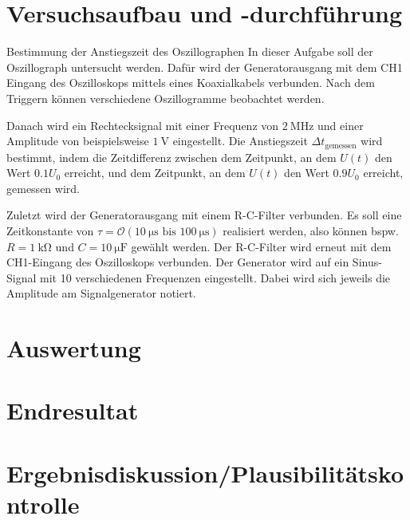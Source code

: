 \documentclass[ngerman]{scrartcl}
\theoremstyle{definition}
\begin{document}
	\section{Versuchsaufbau und -durchführung}
	\begin{aufgabe}{Bestimmung der Anstiegszeit des Oszillographen}
		In dieser Aufgabe soll der Oszillograph untersucht werden. Dafür wird der Generatorausgang mit dem CH1 Eingang des Oszilloskops mittels eines Koaxialkabels verbunden. Nach dem Triggern können verschiedene Oszillogramme beobachtet werden.
		
		Danach wird ein Rechtecksignal mit einer Frequenz von $\SI{2}{\mega\hertz}$ und einer Amplitude von beispielsweise $\SI{1}{\volt}$ eingestellt. Die Anstiegszeit $\Delta t_\mathrm{gemessen}$ wird bestimmt, indem die Zeitdifferenz zwischen dem Zeitpunkt, an dem $U(t)$ den Wert $0.1 U_0$ erreicht, und dem Zeitpunkt, an dem $U(t)$ den Wert $0.9 U_0$ erreicht, gemessen wird.
		
		Zuletzt wird der Generatorausgang mit einem R-C-Filter verbunden. Es soll eine Zeitkonstante von $\tau = \mathcal{O}(\SI{10}{\micro\second} \text{ bis } \SI{100}{\micro\second})$ realisiert werden, also können bspw. $R = \SI{1}{\kilo\ohm}$ und $C = \SI{10}{\micro\farad}$ gewählt werden. Der R-C-Filter wird erneut mit dem CH1-Eingang des Oszilloskops verbunden. Der Generator wird auf ein Sinus-Signal mit 10 verschiedenen Frequenzen eingestellt. Dabei wird sich jeweils die Amplitude am Signalgenerator notiert.
	\end{aufgabe}
	
	
	\section{Auswertung}
	\section{Endresultat}
	\section{Ergebnisdiskussion/Plausibilitätskontrolle}
\end{document}
